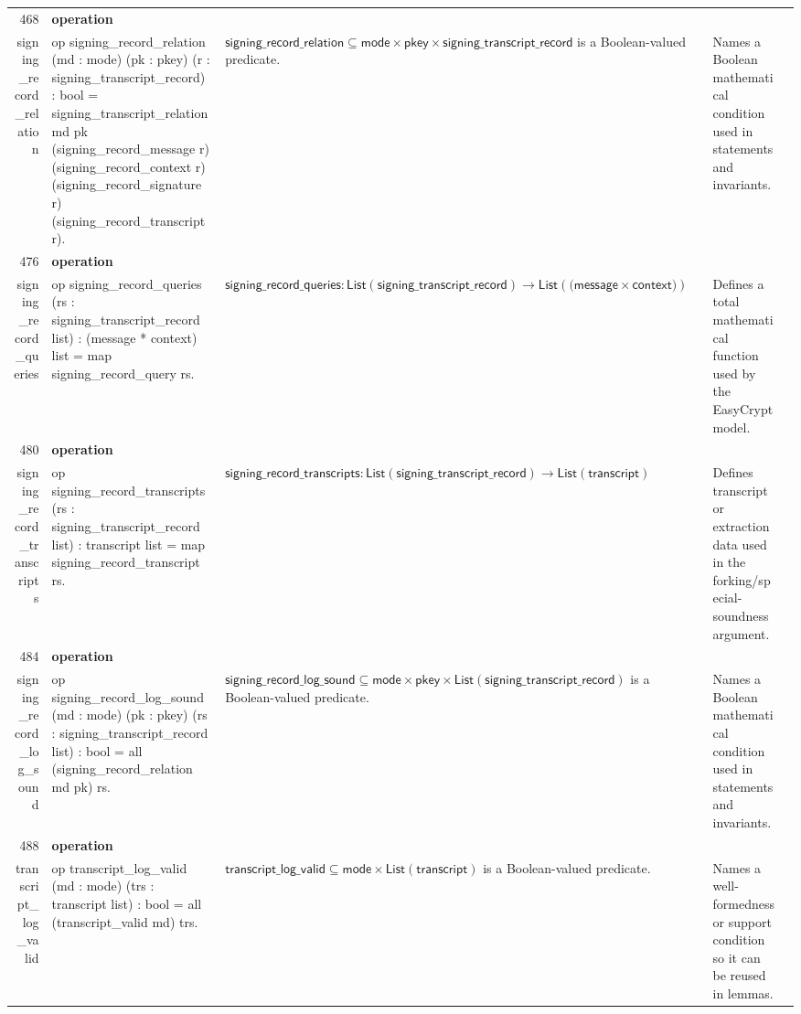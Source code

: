 \documentclass[10pt]{article}
\newcommand{\ec}[1]{\begingroup\ttfamily\scriptsize #1\endgroup}
\begin{document}
\begin{longtable}{r L{0.17\textwidth} L{0.26\textwidth} L{0.27\textwidth} L{0.20\textwidth}}
468 & \textbf{operation}\\\ec{signing\_record\_relation} & \ec{op signing\_record\_relation (md : mode) (pk : pkey) (r : signing\_transcript\_record) : bool = signing\_transcript\_relation md pk (signing\_record\_message r) (signing\_record\_context r) (signing\_record\_signature r) (signing\_record\_transcript r).} & \(\mathsf{signing\_record\_relation} \subseteq \mathsf{mode} \times \mathsf{pkey} \times \mathsf{signing\_transcript\_record}\) is a Boolean-valued predicate. & Names a Boolean mathematical condition used in statements and invariants. \\
476 & \textbf{operation}\\\ec{signing\_record\_queries} & \ec{op signing\_record\_queries (rs : signing\_transcript\_record list) : (message * context) list = map signing\_record\_query rs.} & \(\mathsf{signing\_record\_queries} : \mathsf{List}(\mathsf{signing\_transcript\_record}) \to \mathsf{List}(\mathsf{(message} \times \mathsf{context)})\) & Defines a total mathematical function used by the EasyCrypt model. \\
480 & \textbf{operation}\\\ec{signing\_record\_transcripts} & \ec{op signing\_record\_transcripts (rs : signing\_transcript\_record list) : transcript list = map signing\_record\_transcript rs.} & \(\mathsf{signing\_record\_transcripts} : \mathsf{List}(\mathsf{signing\_transcript\_record}) \to \mathsf{List}(\mathsf{transcript})\) & Defines transcript or extraction data used in the forking/special-soundness argument. \\
484 & \textbf{operation}\\\ec{signing\_record\_log\_sound} & \ec{op signing\_record\_log\_sound (md : mode) (pk : pkey) (rs : signing\_transcript\_record list) : bool = all (signing\_record\_relation md pk) rs.} & \(\mathsf{signing\_record\_log\_sound} \subseteq \mathsf{mode} \times \mathsf{pkey} \times \mathsf{List}(\mathsf{signing\_transcript\_record})\) is a Boolean-valued predicate. & Names a Boolean mathematical condition used in statements and invariants. \\
488 & \textbf{operation}\\\ec{transcript\_log\_valid} & \ec{op transcript\_log\_valid (md : mode) (trs : transcript list) : bool = all (transcript\_valid md) trs.} & \(\mathsf{transcript\_log\_valid} \subseteq \mathsf{mode} \times \mathsf{List}(\mathsf{transcript})\) is a Boolean-valued predicate. & Names a well-formedness or support condition so it can be reused in lemmas. \\

\end{longtable}
\end{document}
